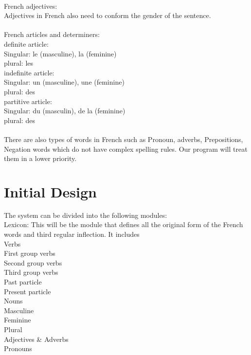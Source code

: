\documentclass[11pt,letterpaper]{article}
\begin{document}
\\
French adjectives:\\
Adjectives in French also need to conform the gender of the sentence.\\
\\
French articles and determiners:\\
\indent definite article:\\
\indent\indent Singular: le (masculine), la (feminine)\\
\indent\indent plural: les\\
\indent indefinite article:\\
\indent\indent Singular: un (masculine), une (feminine)\\
\indent\indent plural: des\\
\indent partitive article:\\
\indent\indent Singular: du (masculin), de la (feminine)\\
\indent\indent plural: des\\
\\
There are also types of words in French such as Pronoun, adverbs, Prepositions, Negation words which do not have complex spelling rules. Our program will treat them in a lower priority.

\section{Initial Design}
The system can be divided into the following modules:\\
\indent Lexicon: This will be the module that defines all the original form of the French words and third regular inflection. It includes\\
\indent\indent Verbs\\
\indent\indent\indent First group verbs\\
\indent\indent\indent Second group verbs\\
\indent\indent\indent Third group verbs\\
\indent\indent\indent Past particle\\
\indent\indent\indent Present particle\\
\indent\indent Nouns\\
\indent\indent\indent Masculine\\
\indent\indent\indent Feminine\\
\indent\indent\indent Plural\\
\indent\indent Adjectives \& Adverbs\\
\indent\indent Pronouns\\
\end{document}
